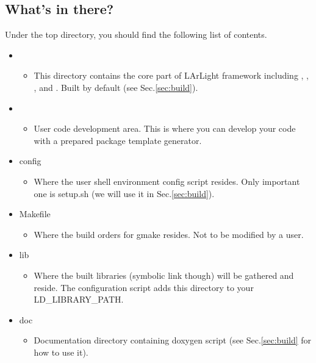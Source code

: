 \subsection{What's in there?}
Under the top directory, you should find the following list of contents.
\begin{itemize}

    \item \Core
      \begin{itemize}
          \item This directory contains the core part of LArLight framework including \Base, \DataFormat, \Analysis, and \LArUtil. Built by default (see Sec.\ref{sec:build}). 
      \end{itemize}

    \item \UserDev
      \begin{itemize}
          \item User code development area. This is where you can develop your code with a prepared package template generator.
      \end{itemize}

    \item {\ttfamily config}
      \begin{itemize}
          \item Where the user shell environment config script resides. Only important one is {\ttfamily setup.sh} (we will use it in Sec.\ref{sec:build}).
      \end{itemize}

    \item {\ttfamily Makefile}
      \begin{itemize}
          \item Where the build orders for {\ttfamily gmake} resides. Not to be modified by a user.
      \end{itemize}

    \item {\ttfamily lib}
      \begin{itemize}
          \item Where the built libraries (symbolic link though) will be gathered and reside. The configuration script adds this directory to your {\ttfamily LD\_LIBRARY\_PATH}.
      \end{itemize}

    \item {\ttfamily doc}
      \begin{itemize}
          \item Documentation directory containing doxygen script (see Sec.\ref{sec:build} for how to use it).
      \end{itemize}


\end{itemize}
